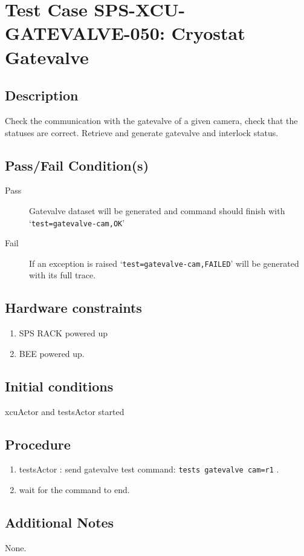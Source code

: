 \section{Test Case SPS-XCU-GATEVALVE-050: Cryostat Gatevalve}

\subsection{Description}

Check the communication with the gatevalve of a given camera, check that the statuses are correct.
Retrieve and generate gatevalve and interlock status.

\subsection{Pass/Fail Condition(s)}

\begin{description}
\item [Pass] Gatevalve dataset will be generated and command should finish with `\texttt{test=gatevalve-cam,OK}'
\item [Fail] If an exception is raised `\texttt{test=gatevalve-cam,FAILED}' will be generated with its full trace.

\end{description}

\subsection{Hardware constraints}

\begin{enumerate}
    \item SPS RACK powered up
    \item BEE powered up.
\end{enumerate}

\subsection{Initial conditions}

xcuActor and testsActor started

\subsection{Procedure}

\begin{enumerate}
    \item testsActor : send gatevalve test command: \texttt{tests gatevalve cam=r1} .
    \item wait for the command to end.
\end{enumerate}

\subsection{Additional Notes}
None.
